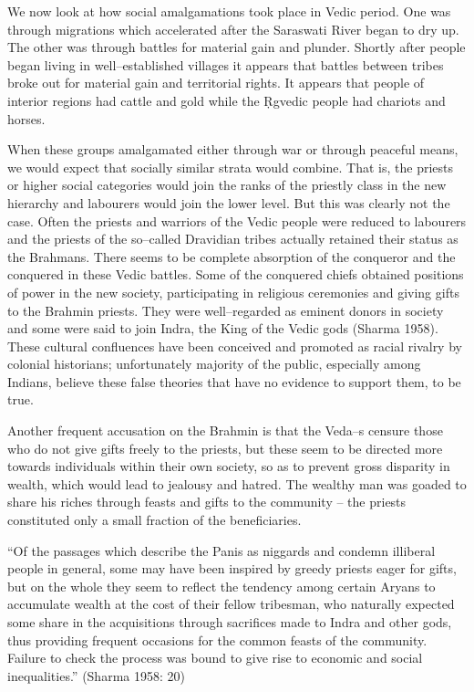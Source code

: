 We now look at how social amalgamations took place in Vedic period. One was through migrations which accelerated after the Saraswati River began to dry up. The other was through battles for material gain and plunder. Shortly after people began living in well–established villages it appears that battles between tribes broke out for material gain and territorial rights. It appears that people of interior regions had cattle and gold while the Ṛgvedic people had chariots and horses. 

When these groups amalgamated either through war or through peaceful means, we would expect that socially similar strata would combine. That is, the priests or higher social categories would join the ranks of the priestly class in the new hierarchy and labourers would join the lower level. But this was clearly not the case. Often the priests and warriors of the Vedic people were reduced to labourers and the priests of the so–called Dravidian tribes actually retained their status as the Brahmans. There seems to be complete absorption of the conqueror and the conquered in these Vedic battles. Some of the conquered chiefs obtained positions of power in the new society, participating in religious ceremonies and giving gifts to the Brahmin priests. They were well–regarded as eminent donors in society and some were said to join Indra, the King of the Vedic gods (Sharma 1958). These cultural confluences have been conceived and promoted as racial rivalry by colonial historians; unfortunately majority of the public, especially among Indians, believe these false theories that have no evidence to support them, to be true.

Another frequent accusation on the Brahmin is that the Veda–s censure those who do not give gifts freely to the priests, but these seem to be directed more towards individuals within their own society, so as to prevent gross disparity in wealth, which would lead to jealousy and hatred. The wealthy man was goaded to share his riches through feasts and gifts to the community – the priests constituted only a small fraction of the beneficiaries.

\begin{myquote}
“Of the passages which describe the Panis as niggards and condemn illiberal people in general, some may have been inspired by greedy priests eager for gifts, but on the whole they seem to reflect the tendency among certain Aryans to accumulate wealth at the cost of their fellow tribesman, who naturally expected some share in the acquisitions through sacrifices made to Indra and other gods, thus providing frequent occasions for the common feasts of the community. Failure to check the process was bound to give rise to economic and social inequalities.” (Sharma 1958: 20)
\end{myquote}

